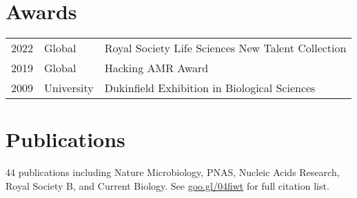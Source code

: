 \documentclass[]{Finlay_Maguire_CV}
\begin{document}
\begin{minipage}[t]{0.66\textwidth}

\section{Awards} 
\begin{tabular}{rll}
2022 & Global      & Royal Society Life Sciences New Talent Collection\\
2019 & Global      & Hacking AMR Award \\
2009 & University & Dukinfield Exhibition in Biological Sciences\\
\end{tabular}

\sectionsep

\vspace{-0.3cm}
\section{Publications} 
%
%
44 publications including Nature Microbiology, PNAS, Nucleic Acids Research, Royal Society B, and Current Biology.
See \url{goo.gl/04fiwt} for full citation list.

\end{minipage}
\end{document}
